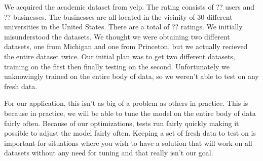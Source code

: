 We acquired the academic dataset from yelp. The rating consists of ?? users and
?? businesses. The businesses are all located in the vicinity of $30$ different
universities in the United States. There are a total of ?? ratings. We initially
misunderstood the datasets. We thought we were obtaining two different
datasets, one from Michigan and one from Princeton, but we actually recieved the
entire dataset twice. Our initial plan was to get two different datasets,
training on the first then finally testing on the second. Unfortunately we
unknowingly trained on the entire body of data, so we weren't able to test on
any fresh data. 

For our application, this isn't as big of a problem as others in practice. This
is because in practice, we will be able to tune the model on the entire body of
data fairly often. Because of our optimizations, tests run fairly quickly making
it possible to adjust the model fairly often. Keeping a set of fresh data to
test on is important for situations where you wish to have a solution that will
work on all datasets without any need for tuning and that really isn't our goal.
